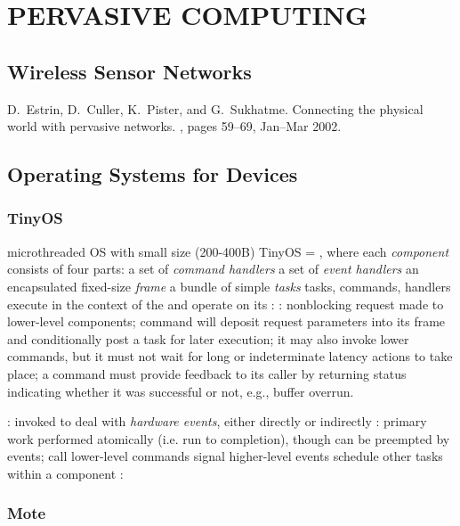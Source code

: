 \documentclass{myproc}
\begin{document}
\section{PERVASIVE COMPUTING}
\subsection{Wireless Sensor Networks}
\bit
\w D.~Estrin, D.~Culler, K.~Pister, and G.~Sukhatme.
\newblock Connecting the physical world with pervasive networks.
, pages 59--69, Jan--Mar 2002.
\eit

\subsection{Operating Systems for Devices}
\subsubsection{TinyOS}
\bit
\w microthreaded OS with small size (200-400B)
\w TinyOS = , where each {\em
  component\/} consists of four parts:
  \ben
  \w [(a)] a set of {\em command handlers}
  \w [(b)] a set of {\em event handlers}
  \w [(c)] an encapsulated fixed-size {\em frame\/}
  \w [(d)] a bundle of simple {\em tasks}
  \een
\w tasks, commands, handlers execute in the context of the  and
operate on its 
  \bit
  \w {}: 
  \w {}: nonblocking request made to lower-level components;
  command will deposit request parameters into its frame and conditionally
  post a task for later execution; it may also invoke lower commands, but it
  must not wait for long or indeterminate latency actions to
  take place; a command must provide feedback to its caller 
  by returning status indicating whether it was successful or
  not, e.g., buffer overrun.

  \w {}: invoked to deal with {\em hardware events\/}, either
  directly or indirectly 
  \w {}: primary work performed atomically (i.e. run to completion),
  though can be preempted by events; 
     \ben
     \w call lower-level commands
     \w signal higher-level events
     \w schedule other tasks within a component
     \een
  \w {}:
  \eit
\eit
\subsubsection{Mote}
\end{document}
